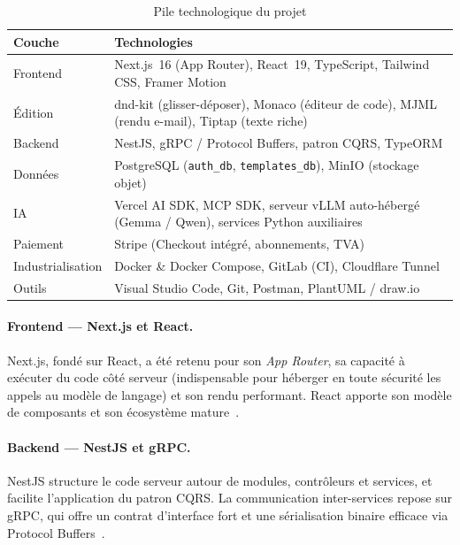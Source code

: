 \begin{table}[H]
\centering
\caption{Pile technologique du projet}
\label{tab:techno}
\small
\begin{tabularx}{\linewidth}{lX}
\toprule
\textbf{Couche} & \textbf{Technologies} \\
\midrule
Frontend & Next.js~16 (App Router), React~19, TypeScript, Tailwind CSS, Framer Motion \\
Édition & dnd-kit (glisser-déposer), Monaco (éditeur de code), MJML (rendu e-mail), Tiptap (texte riche) \\
Backend & NestJS, gRPC / Protocol Buffers, patron CQRS, TypeORM \\
Données & PostgreSQL (\texttt{auth\_db}, \texttt{templates\_db}), MinIO (stockage objet) \\
IA & Vercel AI SDK, MCP SDK, serveur vLLM auto-hébergé (Gemma / Qwen), services Python auxiliaires \\
Paiement & Stripe (Checkout intégré, abonnements, TVA) \\
Industrialisation & Docker \& Docker Compose, GitLab (CI), Cloudflare Tunnel \\
Outils & Visual Studio Code, Git, Postman, PlantUML / draw.io \\
\bottomrule
\end{tabularx}
\end{table}

\paragraph{Frontend — Next.js et React.}
Next.js, fondé sur React, a été retenu pour son \emph{App Router}, sa
capacité à exécuter du code côté serveur (indispensable pour héberger en
toute sécurité les appels au modèle de langage) et son rendu performant.
React apporte son modèle de composants et son écosystème mature~\cite{nextjs,react}.


\paragraph{Backend — NestJS et gRPC.}
NestJS structure le code serveur autour de modules, contrôleurs et
services, et facilite l'application du patron CQRS. La communication
inter-services repose sur gRPC, qui offre un contrat d'interface fort et une
sérialisation binaire efficace via Protocol Buffers~\cite{nestjs,grpc}.

